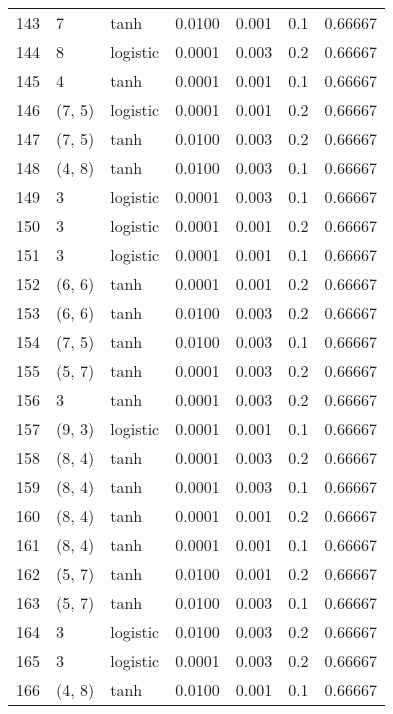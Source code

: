 \begin{tabular}{lllrrrr}
143 &           7 &      tanh &  0.0100 &  0.001 &  0.1 &   0.66667 \\
144 &           8 &  logistic &  0.0001 &  0.003 &  0.2 &   0.66667 \\
145 &           4 &      tanh &  0.0001 &  0.001 &  0.1 &   0.66667 \\
146 &      (7, 5) &  logistic &  0.0001 &  0.001 &  0.2 &   0.66667 \\
147 &      (7, 5) &      tanh &  0.0100 &  0.003 &  0.2 &   0.66667 \\
148 &      (4, 8) &      tanh &  0.0100 &  0.003 &  0.1 &   0.66667 \\
149 &           3 &  logistic &  0.0001 &  0.003 &  0.1 &   0.66667 \\
150 &           3 &  logistic &  0.0001 &  0.001 &  0.2 &   0.66667 \\
151 &           3 &  logistic &  0.0001 &  0.001 &  0.1 &   0.66667 \\
152 &      (6, 6) &      tanh &  0.0001 &  0.001 &  0.2 &   0.66667 \\
153 &      (6, 6) &      tanh &  0.0100 &  0.003 &  0.2 &   0.66667 \\
154 &      (7, 5) &      tanh &  0.0100 &  0.003 &  0.1 &   0.66667 \\
155 &      (5, 7) &      tanh &  0.0001 &  0.003 &  0.2 &   0.66667 \\
156 &           3 &      tanh &  0.0001 &  0.003 &  0.2 &   0.66667 \\
157 &      (9, 3) &  logistic &  0.0001 &  0.001 &  0.1 &   0.66667 \\
158 &      (8, 4) &      tanh &  0.0001 &  0.003 &  0.2 &   0.66667 \\
159 &      (8, 4) &      tanh &  0.0001 &  0.003 &  0.1 &   0.66667 \\
160 &      (8, 4) &      tanh &  0.0001 &  0.001 &  0.2 &   0.66667 \\
161 &      (8, 4) &      tanh &  0.0001 &  0.001 &  0.1 &   0.66667 \\
162 &      (5, 7) &      tanh &  0.0100 &  0.001 &  0.2 &   0.66667 \\
163 &      (5, 7) &      tanh &  0.0100 &  0.003 &  0.1 &   0.66667 \\
164 &           3 &  logistic &  0.0100 &  0.003 &  0.2 &   0.66667 \\
165 &           3 &  logistic &  0.0001 &  0.003 &  0.2 &   0.66667 \\
166 &      (4, 8) &      tanh &  0.0100 &  0.001 &  0.1 &   0.66667 \\

\end{tabular}
